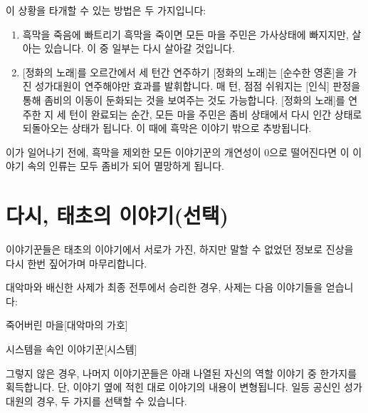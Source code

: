 \documentclass{report}
\begin{document}
		이 상황을 타개할 수 있는 방법은 두 가지입니다:
		\begin{enumerate}
			\item 흑막을 죽음에 빠트리기
				\subitem{$\rightarrow$} 흑막을 죽이면 모든 마을 주민은 가사상태에 빠지지만, 살아는 있습니다. 이 중 일부는 다시 살아갈 것입니다.
			\item{} [정화의 노래]를 오르간에서 세 턴간 연주하기
				\subitem{$\rightarrow$} [정화의 노래]는 [순수한 영혼]을 가진 성가대원이 연주해야만 효과를 발휘합니다. 매 턴, 점점 쉬워지는 [인식] 판정을 통해 좀비의 이동이 둔화되는 것을 보여주는 것도 가능합니다. [정화의 노래]를 연주한 지 세 턴이 완료되는 순간, 모든 마을 주민은 좀비 상태에서 다시 인간 상태로 되돌아오는 상태가 됩니다. 이 때에 흑막은 이야기 밖으로 추방됩니다.
		\end{enumerate}
		
		이가 일어나기 전에, 흑막을 제외한 모든 이야기꾼의 개연성이 0으로 떨어진다면 이 이야기 속의 인류는 모두 좀비가 되어 멸망하게 됩니다.
	
	\section{다시, 태초의 이야기(선택)}
		이야기꾼들은 태초의 이야기에서 서로가 가진, 하지만 말할 수 없었던 정보로 진상을 다시 한번 짚어가며 마무리합니다.
		
		대악마와 배신한 사제가 최종 전투에서 승리한 경우, 사제는 다음 이야기들을 얻습니다:
		\begin{spoiler}{죽어버린 마을}{[대악마의 가호]}
		\end{spoiler}
		
		\begin{spoiler}{시스템을 속인 이야기꾼}{[시스템]}
		\end{spoiler}
		
		그렇지 않은 경우, 나머지 이야기꾼들은 아래 나열된 자신의 역할 이야기 중 한가지를 획득합니다. 단, 이야기 옆에 적힌 대로 이야기의 내용이 변형됩니다. 일등 공신인 성가대원의 경우, 두 가지를 선택할 수 있습니다.
		
\end{document}
